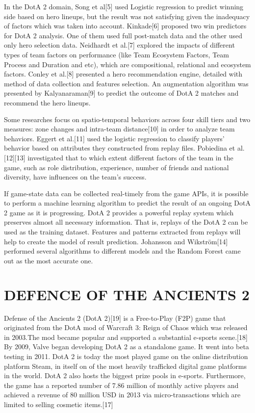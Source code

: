 \documentclass[letterpaper, 10 pt, conference]{ieeeconf}  %
\begin{document}
In the DotA 2 domain, Song et al[5] used Logistic regression to predict winning side based on hero lineups, but the result was not satisfying given the inadequacy of factors which was taken into account. Kinkade[6] proposed two win predictors for DotA 2 analysis. One of them used full post-match data and the other used only hero selection data. Neidhardt et al.[7] explored the impacts of different types of team factors on performance (like Team Ecosystem Factors, Team Process and Duration and etc), which are compositional, relational and ecosystem factors. Conley et al.[8] presented a hero recommendation engine, detailed with method of data collection and features selection. An augmentation algorithm was presented by Kalyanaraman[9] to predict the outcome of DotA 2 matches and recommend the hero lineups.

Some researches focus on spatio-temporal behaviors across four skill tiers and two measures: zone changes and intra-team distance[10] in order to analyze team behaviors. Eggert et al.[11] used the logistic regression to classify players' behavior based on attributes they constructed from replay files. Pobiedina et al.[12][13] investigated that to which extent different factors of the team in the game, such as role distribution, experience, number of friends and national diversity, have influences on the team's success.

If game-state data can be collected real-timely from the game APIs, it is possible to perform a machine learning algorithm to predict the result of an ongoing DotA 2 game as it is progressing. DotA 2 provides a powerful replay system which preserves almost all necessary information. That is, replays of the DotA 2 can be used as the training dataset. Features and patterns extracted from replays will help to create the model of result prediction. Johansson and Wikström[14] performed several algorithms to different models and the Random Forest came out as the most accurate one.

\section{DEFENCE OF THE ANCIENTS 2}

Defense of the Ancients 2 (DotA 2)[19] is a Free-to-Play (F2P) game that originated from the DotA mod of Warcraft 3: Reign of Chaos which was released in 2003.The mod became popular and supported a substantial e-sports scene.[18] By 2009, Valve began developing DotA 2 as a standalone game. It went into beta testing in 2011. DotA 2 is today the most played game on the online distribution platform Steam, in itself on of the most heavily trafficked digital game platforms in the world. DotA 2 also hosts the biggest prize pools in e-sports. Furthermore, the game has a reported number of 7.86 million of monthly active players and achieved a revenue of 80 million USD in 2013 via micro-transactions which are limited to selling cosmetic items.[17]
\end{document}
